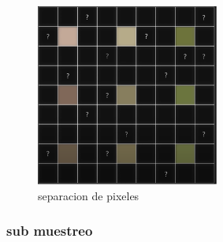 \documentclass{article}
\begin{document}
\begin{figure}[h]
\includegraphics[width=6cm]{matriz_a_llenar.png}
\centering
\caption{separacion de pixeles}
\label{fig:matriz de leds}
\end{figure}

\subsubsection{sub muestreo }\label{contenido}






\end{document}
